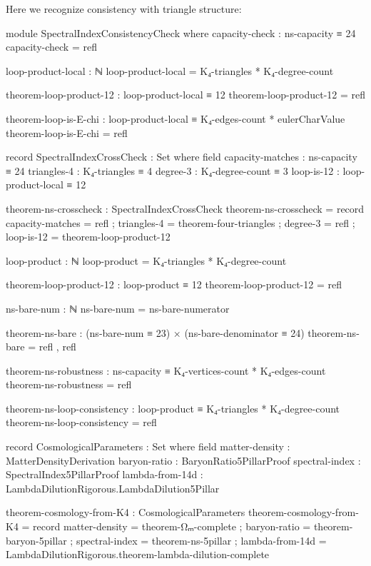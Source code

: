 \documentclass[11pt,a4paper]{book}
\begin{document}
Here we recognize consistency with triangle structure:

\begin{code}
module SpectralIndexConsistencyCheck where
  capacity-check : ns-capacity ≡ 24
  capacity-check = refl
  
  loop-product-local : ℕ
  loop-product-local = K₄-triangles * K₄-degree-count
  
  theorem-loop-product-12 : loop-product-local ≡ 12
  theorem-loop-product-12 = refl
  
  theorem-loop-is-E-chi : loop-product-local ≡ K₄-edges-count * eulerCharValue
  theorem-loop-is-E-chi = refl
  
  record SpectralIndexCrossCheck : Set where
    field
      capacity-matches : ns-capacity ≡ 24
      triangles-4      : K₄-triangles ≡ 4
      degree-3         : K₄-degree-count ≡ 3
      loop-is-12       : loop-product-local ≡ 12
  
  theorem-ns-crosscheck : SpectralIndexCrossCheck
  theorem-ns-crosscheck = record
    { capacity-matches = refl
    ; triangles-4      = theorem-four-triangles
    ; degree-3         = refl
    ; loop-is-12       = theorem-loop-product-12
    }

loop-product : ℕ
loop-product = K₄-triangles * K₄-degree-count

theorem-loop-product-12 : loop-product ≡ 12
theorem-loop-product-12 = refl

ns-bare-num : ℕ
ns-bare-num = ns-bare-numerator

theorem-ns-bare : (ns-bare-num ≡ 23) × (ns-bare-denominator ≡ 24)
theorem-ns-bare = refl , refl
\end{code}

\begin{code}
theorem-ns-robustness : ns-capacity ≡ K₄-vertices-count * K₄-edges-count
theorem-ns-robustness = refl

theorem-ns-loop-consistency : loop-product ≡ K₄-triangles * K₄-degree-count
theorem-ns-loop-consistency = refl

record CosmologicalParameters : Set where
  field
    matter-density    : MatterDensityDerivation
    baryon-ratio      : BaryonRatio5PillarProof
    spectral-index    : SpectralIndex5PillarProof
    lambda-from-14d   : LambdaDilutionRigorous.LambdaDilution5Pillar
\end{code}

\begin{code}
theorem-cosmology-from-K4 : CosmologicalParameters
theorem-cosmology-from-K4 = record
  { matter-density  = theorem-Ωₘ-complete
  ; baryon-ratio    = theorem-baryon-5pillar
  ; spectral-index  = theorem-ns-5pillar
  ; lambda-from-14d = LambdaDilutionRigorous.theorem-lambda-dilution-complete
  }
\end{code}
\end{document}
